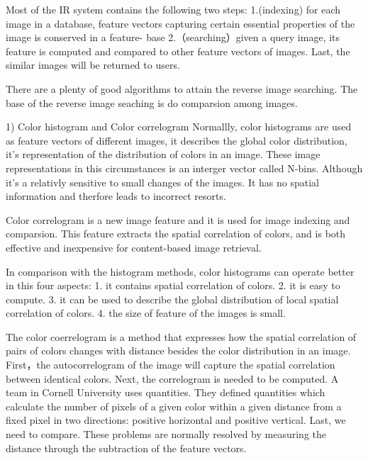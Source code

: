 Most of the IR system contains the following two steps:
1.(indexing)  for each image in a database, 
feature vectors capturing certain essential properties of the image is conserved in a feature- base
2.（searching）given a query image, its feature is computed and compared to other feature vectors of images.
Last, the similar images will be returned to users.

There are a plenty of good algorithms to attain the reverse image searching.
The base of the reverse image seaching is do comparsion among images.

1) Color histogram and Color correlogram %
Normallly, color histograms are used as feature vectors of different images,
it describes the global color distribution, it's representation of the distribution of colors in an image. %
These image representations in this circumstances is an interger vector called N-bins.
Although it's a relativly sensitive to small changes of the images.
It has no spatial information and therfore leads to incorrect resorts.

Color correlogram is a new image feature and it is used for image indexing and comparsion.
This feature extracts the spatial correlation of colors, 
and is both effective and inexpensive for content-based image retrieval.

In comparison with the histogram methods, color histograms can operate better in this four aspects:
1. it contains spatial correlation of colors.
2. it is easy to compute.
3. it can be used to describe the global distribution of local spatial correlation of colors.
4. the size of feature of the images is small.

The color coerrelogram is a method that expresses how the spatial correlation of pairs of colors changes with distance besides the color distribution in an image.
First，the autocorrelogram of the image will capture the spatial correlation between identical colors.
Next, the correlogram is needed to be computed.
A team in Cornell University uses quantities. 
They defined quantities which calculate the number of pixels of a given color within a given distance from a fixed pixel in two directions: positive horizontal and positive vertical.
Last, we need to compare. 
These problems are normally resolved by measuring the distance through the subtraction of the feature vectors.



